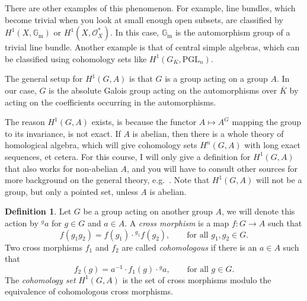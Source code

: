 \documentclass[12pt]{article}
\theoremstyle{definition}
\newtheorem{definition}[theorem]{Definition}
\numberwithin{equation}{subsection}
\begin{document}
There are other examples of this phenomenon.
For example, line bundles, which become trivial when you look at small enough open subsets, are classified by $H^1(X, \mathbb{G}_\mathrm{m})$ or $H^1(X, \mathcal{O}_X^*)$.
In this case, $\mathbb{G}_\mathrm{m}$ is the automorphism group of a trivial line bundle.
Another example is that of central simple algebras, which can be classified using cohomology sets like $H^1(G_K, \mathrm{PGL}_n)$.

The general setup for $H^1(G, A)$ is that $G$ is a group acting on a group $A$.
In our case, $G$ is the absolute Galois group acting on the automorphisms over $\overline{K}$ by acting on the coefficients occurring in the automorphisms.

The reason $H^1(G,A)$ exists, is because the functor $A \mapsto A^G$ mapping the group to its invariance, is not exact. 
If $A$ is abelian, then there is a whole theory of homological algebra, which will give cohomology sets $H^n(G,A)$ with long exact sequences, et cetera.
For this course, I will only give a definition for $H^1(G,A)$ that also works for non-abelian $A$, and you will have to consult other sources for more background on the general theory, e.g.\ \cite[App.~B]{SilvermanBook}.
Note that $H^1(G,A)$ will not be a group, but only a pointed set, unless $A$ is abelian.

\begin{definition}
Let $G$ be a group acting on another group $A$, we will denote this action by ${}^ga$ for $g \in G$ and $a \in A$.
A {\em cross morphism} is a map $f \colon G \to A$ such that
$$f(g_1g_2) = f(g_1) \cdot {}^{g_1}f(g_2), \qquad \textrm{for all $g_1,g_2 \in G$.}$$
Two cross morphisms $f_1$ and $f_2$ are called {\em cohomologous} if there is an $a \in A$ such that $$f_2(g) = a^{-1} \cdot f_1(g) \cdot {}^ga, \qquad \textrm{for all $g \in G$.}$$
The {\em cohomology set} $H^1(G,A)$ is the set of cross morphisms modulo the equivalence of cohomologous cross morphisms.
\end{definition}
\end{document}
